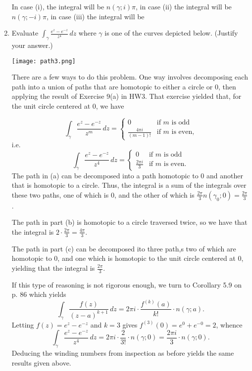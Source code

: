 \documentclass[11pt,oneside,english]{amsart}
\theoremstyle{definition}
\begin{document}
\begin{enumerate}[leftmargin=*]
In case (i), the integral will be $n(\gamma;i)\pi$, in case (ii) the integral will be $n(\gamma;-i)\pi$, in case (iii) the integral will be

\item Evaluate $\displaystyle \int_\gamma \frac{e^z-e^{-z}}{z^4}\,dz$ where $\gamma$ is one of the curves depicted below. (Justify your answer.)

\begin{center}
\texttt{[image: path3.png]}
\end{center}

There are a few ways to do this problem. One way involves decomposing each path into a union of paths that are homotopic to either a circle or 0, then applying the result of Exercise 9(a) in HW3. That exercise yielded that, for the unit circle centered at 0, we have

\[
\int_\gamma \frac{e^z-e^{-z}}{z^m}\,dz=\begin{cases}0 & \text{if $m$ is odd} \\ \frac{4\pi i}{(m-1)!} & \text{if $m$ is even,}\end{cases}
\]
i.e.
\[
\int_\gamma \frac{e^z-e^{-z}}{z^4}\,dz=\begin{cases}0 & \text{if $m$ is odd} \\ \frac{2\pi i}{3} & \text{if $m$ is even.}\end{cases}
\]
The path in (a) can be decomposed into a path homotopic to 0 and another that is homotopic to a circle. Thus, the integral is a sum of the integrals over these two paths, one of which is 0, and the other of which is $\frac{2\pi}{3}n(\gamma_0;0)=\frac{2\pi}{3}$.

The path in part (b) is homotopic to a circle traversed twice, so we have that the integral is $2\cdot\frac{2\pi}{3}=\frac{4\pi}{3}$.

The path in part (c) can be decomposed ito three path,s two of which are homotopic to 0, and one which is homotopic to the unit circle centered at 0, yielding that the integral is $\frac{2\pi}{3}$.

If this type of reasoning is not rigorous enough, we turn to Corollary 5.9 on p. 86 which yields
\[
\int_\gamma\frac{f(z)}{(z-a)^{k+1}}\,dz=2\pi i\cdot \frac{f^{(k)}(a)}{k!}\cdot n(\gamma;a).
\]
Letting $f(z)=e^z-e^{-z}$ and $k=3$ gives $f^{(3)}(0)=e^0+e^{-0}=2$, whence
\[
\int_\gamma\frac{e^z-e^{-z}}{z^{4}}\,dz=2\pi i\cdot \frac{2}{3!}\cdot n(\gamma;0)=\frac{2\pi i}{3}\cdot n(\gamma;0).
\]
Deducing the winding numbers from inspection as before yields the same results given above.
\end{enumerate}
\end{document}
